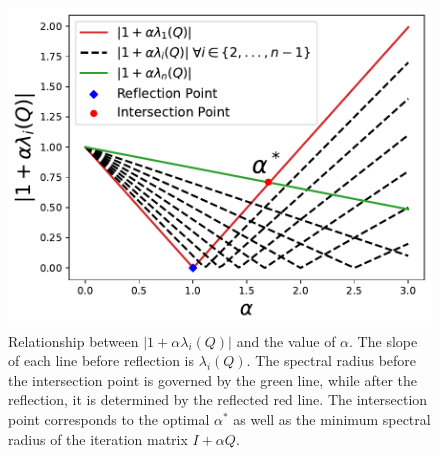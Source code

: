 \documentclass[letterpaper]{article} %
\begin{document}
\begin{figure}[t!]
\centering
\includegraphics[width=0.85\linewidth]{Figures/alpha5.pdf}
\vspace{-5pt}
\caption{Relationship between $|1 + \alpha \lambda_i(Q)|$ and the value of $\alpha$. The slope of each line before reflection is $\lambda_i\left(Q\right)$. The spectral radius before the intersection point is governed by the green line, while after the reflection, it is determined by the reflected red line. The intersection point corresponds to the optimal $\alpha^*$ as well as the minimum spectral radius of the iteration matrix $I + \alpha Q
$.}
\vspace{-5pt}
\label{fig:1}
\end{figure}
\end{document}
